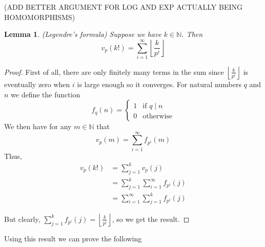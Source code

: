 \documentclass{article}
\newtheorem{lemma}{Lemma}[section]
\newcommand{\mbb}[1]{\mathbb{#1}}
\begin{document}
(ADD BETTER ARGUMENT FOR LOG AND EXP ACTUALLY BEING HOMOMORPHISMS)


\begin{lemma}(Legendre's formula)
    Suppose we have $k \in \mbb N$. Then
    $$v_p(k!) = \sum_{i = 1}^{\infty} \left\lfloor \frac{k}{p^i} \right \rfloor$$
\end{lemma}

\begin{proof}
    First of all, there are only finitely many terms in the sum since $\left\lfloor \frac{k}{p^i} \right \rfloor$ is eventually zero when $i$ is large enough so it converges. For natural numbers $q$ and $n$ we define the function 
    $$f_q(n) = \begin{cases}
        1 & \text{if } q \mid n \\
        0 & \text{otherwise}
    \end{cases}$$
    We then have for any $m \in \mbb N$ that
    $$v_p(m) = \sum_{i = 1}^{\infty} f_{p^i}(m)$$
    Thus,
    \begin{align*}
        v_p(k!) &= \sum_{j = 1}^k v_p(j) \\
        &= \sum_{j = 1}^k \sum_{i = 1}^{\infty} f_{p^i}(j) \\
        &= \sum_{i = 1}^{\infty} \sum_{j = 1}^k f_{p^i}(j)
    \end{align*}


    But clearly, $\sum_{j = 1}^k f_{p^i}(j) = \left\lfloor \frac{k}{p^i} \right \rfloor$, so we get the result. 
\end{proof}

Using this result we can prove the following
\end{document}
